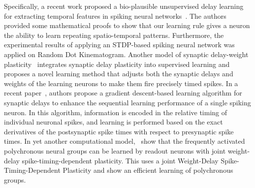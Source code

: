 \documentclass[brainsci, %
               review,submit,pdftex,moreauthors%
               ]{Definitions/mdpi}
\begin{document}
Specifically, a recent work proposed a bio-plausible unsupervised delay learning for extracting temporal features in spiking neural networks~\citep{nadafian_bio-plausible_2020}. The authors provided some mathematical proofs to show that our learning rule gives a neuron the ability to learn repeating spatio-temporal patterns. Furthermore, the experimental results of applying an STDP-based spiking neural network was applied on Random Dot Kinematogram. Another model of synaptic delay-weight plasticity~\citep{zhang_supervised_2020} integrates synaptic delay plasticity into supervised learning and proposes a novel learning method that adjusts both the synaptic delays and weights of the learning neurons to make them fire precisely timed spikes. %
In a recent paper~\citep{luo_supervised_2022}, authors propose a gradient descent-based learning algorithm for synaptic delays to enhance the sequential learning performance of a single spiking neuron. In this algorithm, information is encoded in the relative timing of individual neuronal spikes, and learning is performed based on the exact derivatives of the postsynaptic spike times with respect to presynaptic spike times.
In yet another computational model,~\citet{sun_learning_2016} show that the frequently activated polychronous neural groups can be learned by readout neurons with joint weight-delay spike-timing-dependent plasticity. This uses a joint Weight-Delay Spike-Timing-Dependent Plasticity and show an efficient learning of polychronous groups.

\end{document}
